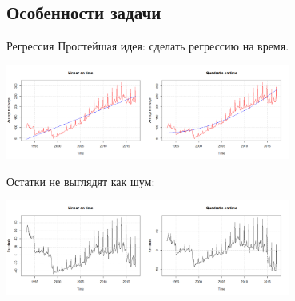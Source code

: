 \documentclass[9pt,pdf,utf8,hyperref={unicode},aspectratio=169]{beamer}
\begin{document}
\subsection{Особенности задачи}
\begin{frame}{Регрессия}
	Простейшая идея: сделать регрессию на время.
	\begin{center}
		\includegraphics[width=0.7\textwidth]{wage1.png}
	\end{center}		
	
	Остатки не выглядят как шум:
	\begin{center}
		\includegraphics[width=0.7\textwidth]{wage2.png}
	\end{center}			
\end{frame}
\end{document}
